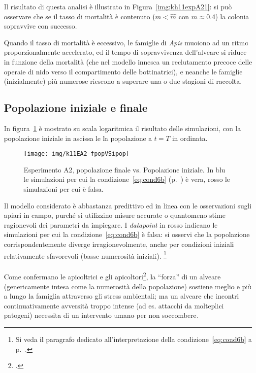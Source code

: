 Il risultato di questa analisi è illustrato in Figura~\ref{img:kh11expA21}: si può osservare che se il tasso di mortalità
è contenuto ($m< \hat{m}$ con $m \approx 0.4$) la colonia sopravvive con successo.

Quando il tasso di mortalità è eccessivo, le famiglie di \emph{Apis} muoiono ad un ritmo proporzionalmente accelerato, ed
il tempo di sopravvivenza dell'alveare si riduce in funzione della mortalità (che nel modello innesca un reclutamento
precoce delle operaie di nido verso il compartimento delle bottinatrici), e neanche le famiglie (inizialmente) più numerose
riescono a superare una o due stagioni di raccolta.


\subsection{Popolazione iniziale e finale}
In figura~\ref{img:kh11expA22} è mostrato su scala logaritmica il risultato delle simulazioni, con la popolazione
iniziale in ascissa le la popolazione a $t=T$ in ordinata.
\begin{figure}[hbt]
    \centering
    \texttt{[image: img/k11EA2-fpopVSipop]}

    \caption[Esperimento A2, popolazione finale vs. Popolazione iniziale.]{Esperimento A2, popolazione finale vs.
    Popolazione iniziale. In blu le simulazioni per cui la condizione~\eqref{eq:cond6b} (p.~\pageref{eq:cond6b}) è vera,
    rosso le simulazioni per cui è falsa.}

    \label{img:kh11expA22}
\end{figure}

Il modello considerato è abbastanza predittivo ed in linea con le osservazioni sugli apiari in campo, purché si
utilizzino misure accurate o quantomeno stime ragionevoli dei parametri da impiegare.
I \emph{datapoint} in rosso indicano le simulazioni per cui la condizione~\eqref{eq:cond6b} è falsa: si
osservi che la popolazione corrispondentemente diverge irragionevolmente, anche per condizioni iniziali
relativamente sfavorevoli (\ie basse numerosità iniziali).
\footnote{Si veda il paragrafo dedicato all'interpretazione della condizione~\eqref{eq:cond6b}
a p.~\pageref{par:interpretationCond6b}.}

\paragraph{}
Come confermano le apicoltrici e gli apicoltori\footcite{privFDL,privFPan,meccanica},
la ``forza'' di un alveare (genericamente intesa come la numerosità della popolazione)
sostiene meglio e più a lungo la famiglia attraverso gli stress ambientali;
ma un alveare che incontri continuativamente avversità troppo intense (ad es. attacchi da molteplici
patogeni) necessita di un intervento umano per non soccombere.

